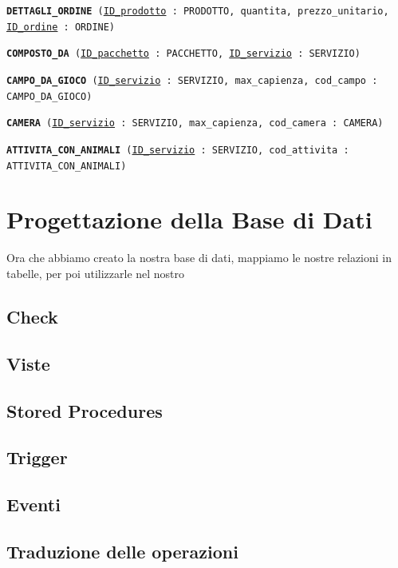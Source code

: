\documentclass[a4paper,12pt]{report}
\begin{document}
\begin{description}
	\item\texttt{\textbf{DETTAGLI\_ORDINE} (\underline{ID\_prodotto} : PRODOTTO, quantita, prezzo\_unitario, \newline \underline{ID\_ordine} : ORDINE)}
	\item\texttt{\textbf{COMPOSTO\_DA} (\underline{ID\_pacchetto} : PACCHETTO, \underline{ID\_servizio} : SERVIZIO)}
	\item\texttt{\textbf{CAMPO\_DA\_GIOCO} (\underline{ID\_servizio} : SERVIZIO, max\_capienza, \newline cod\_campo : CAMPO\_DA\_GIOCO)}
	\item\texttt{\textbf{CAMERA} (\underline{ID\_servizio} : SERVIZIO, max\_capienza, cod\_camera : CAMERA)}
	\item\texttt{\textbf{ATTIVITA\_CON\_ANIMALI} (\underline{ID\_servizio} : SERVIZIO, \newline cod\_attivita : ATTIVITA\_CON\_ANIMALI)}
\end{description}

\chapter{Progettazione della Base di Dati}
Ora che abbiamo creato la nostra base di dati, mappiamo le nostre relazioni in tabelle, per poi utilizzarle nel nostro

\section{Check}

\section{Viste}

\section{Stored Procedures}

\section{Trigger}

\section{Eventi}

\section{Traduzione delle operazioni}
\end{document}
